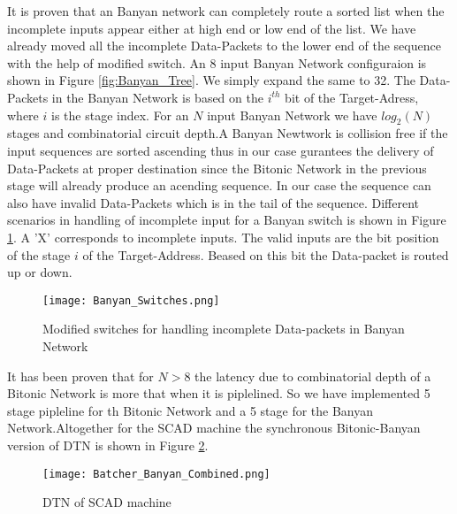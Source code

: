 					      It is proven \cite{batcher_banyan_ref} that 
					      an Banyan network can completely route a sorted list when the incomplete inputs appear either at high end or low end of the list. We have already moved all the incomplete Data-Packets
					      to the lower end of the sequence with the help of modified switch. An 8 input Banyan Network configuraion is shown in Figure \ref{fig:Banyan_Tree}. We simply expand the same to 32.
					      The Data-Packets in the Banyan Network is based on the $i^{th}$ bit of the Target-Adress, where $i$ is the stage index. For an $N$ input Banyan Network we have $log_{2}(N)$ 
					      stages and combinatorial circuit depth.A Banyan Newtwork is collision free if the input sequences are sorted ascending
					      thus in our case gurantees the delivery of Data-Packets at proper destination since the Bitonic Network in the previous stage will already produce an acending sequence. In our case 
					      the sequence can also have invalid Data-Packets which is in the tail of the sequence. Different scenarios in handling of incomplete input for a Banyan switch is shown in Figure \ref{fig:Banyan_Switches}.
					      A 'X' corresponds to incomplete inputs. The valid inputs are the bit position of the stage $i$ of the Target-Address. Beased on this bit the Data-packet is routed up or down.
					      \begin{figure}[!ht]
						      \texttt{[image: Banyan\_Switches.png]}
						      \caption{Modified switches for handling incomplete Data-packets in Banyan Network }
					      \label{fig:Banyan_Switches}
					      \end{figure}
					      It has been proven \cite{sorting_network_on_fpgas} that for $N > 8$ the latency
					      due to combinatorial depth of a Bitonic Network is more that when it is piplelined. So we have implemented 5 stage pipleline for th Bitonic Network and a 5 stage for 
					      the Banyan Network.Altogether for the SCAD machine the synchronous Bitonic-Banyan version of DTN is shown in Figure \ref{fig:Batcher_Banyan_Combined}.
					      \begin{figure}[!ht]
						      \texttt{[image: Batcher\_Banyan\_Combined.png]}
						      \caption{DTN of SCAD machine}
					      \label{fig:Batcher_Banyan_Combined}
					      \end{figure}

